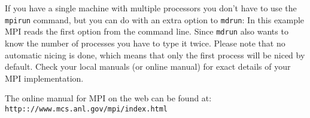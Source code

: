 If you have a single machine with multiple processors you don't have to
use the {\tt mpirun} command, but you can do with an extra option to
{\tt mdrun}:
In this example MPI reads the first option from the command line.
Since {\tt mdrun} also wants to know the number of processes you have to
type it twice.
Please note that no automatic nicing is done, which means that only
the first process will be niced by default. 
Check your local manuals (or online manual) for exact details
of your MPI implementation.

The online manual for MPI on the web can be found at:\\
{\tt http:://www.mcs.anl.gov/mpi/index.html}
